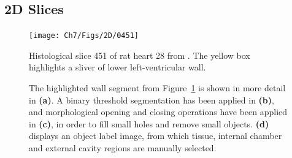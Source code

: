   \subsection{2D Slices} %
  \label{sub:2d_slices}
    \begin{figure}[htbp]
      \centering
      \texttt{[image: Ch7/Figs/2D/0451]}
      \caption{Histological slice 451 of rat heart 28 from \cite{Burton2006}. The yellow box highlights a sliver of lower left-ventricular wall.}
      \label{fig:2D_full_slice}
    \end{figure}
  
    \begin{figure}[htbp]
      \centering
      \caption{The highlighted wall segment from Figure~\ref{fig:2D_full_slice} is shown in more detail in \textbf{(a)}. A binary threshold segmentation has been applied in \textbf{(b)}, and morphological opening and closing operations have been applied in \textbf{(c)}, in order to fill small holes and remove small objects. \textbf{(d)} displays an object label image, from which tissue, internal chamber and external cavity regions are manually selected.}
      \label{fig:2D_segmentation}
    \end{figure}
  
